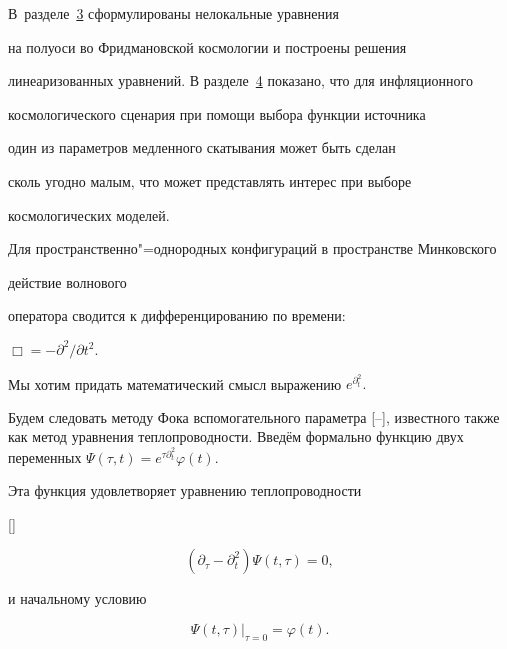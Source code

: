 В~разделе~\hyperlink{razd:3}{3} сформулированы нелокальные уравнения

на полуоси во Фридмановской космологии и построены решения

линеаризованных уравнений. В разделе~\hyperlink{razd:4}{4} показано, что для инфляционного

космологического сценария при помощи выбора функции источника

один из параметров медленного скатывания может быть сделан

сколь угодно малым, что может представлять интерес при выборе

космологических моделей.



\smallskip



\hypertarget{razd:1}{}




Для пространственно"=однородных  конфигураций  в пространстве Минковского

действие волнового

оператора сводится к дифференцированию по времени:

$\Box=-\partial^2/\partial t^2$.

Мы хотим придать математический смысл выражению $e^{\partial_t ^2}.$

Будем следовать методу Фока вспомогательного параметра [--], известного также как метод уравнения теплопроводности. Введём формально функцию двух переменных $\Psi(\tau,t)=

 e^{\tau\partial_t ^2}\varphi(t)$.

Эта функция удовлетворяет уравнению теплопроводности

[]

\begin{equation}

\label{HE}

(\partial _\tau-\partial_t ^2)\Psi(t,\tau)=0,\end{equation}

и начальному условию

\begin{equation}

\label{BC}

\Psi(t,\tau)|_{\tau=0}=\varphi(t).

\end{equation}





